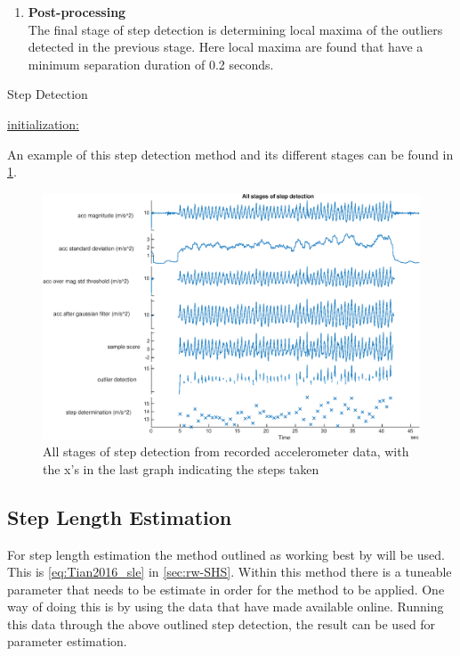 \begin{enumerate}
	
	\item \textbf{Post-processing} \\
	The final stage of step detection is determining local maxima of the outliers detected in the previous stage. Here local maxima are found that have a minimum separation duration of 0.2 seconds.
	
\end{enumerate}

\begin{algorithm}[]
	\SetAlgoLined
	\caption{Step Detection}
	\label{algo:step_detect}
	\underline{initialization:}\\
\end{algorithm}

An example of this step detection method and its different stages can be found in \cref{fig:all_stages_of_step_detection}.

\begin{figure}[H]
	\centering
	\includegraphics[width=1\linewidth]{images/20200924_1204_All_stages_of_step_detection}
	\caption[All stages of step detection ]{All stages of step detection from recorded accelerometer data, with the x's in the last graph indicating the steps taken }
	\label{fig:all_stages_of_step_detection}
\end{figure}
\subsection*{Step Length Estimation}
For step length estimation the method outlined as working best by \cite{Vezocnik2019} will be used. This is \eqref{eq:Tian2016_sle} in \cref{sec:rw-SHS}. Within this method there is a tuneable parameter that needs to be estimate in order for the method to be applied. One way of doing this is by using the data that \cite{Vezocnik2019} have made available online. Running this data through the above outlined step detection, the result can be used for parameter estimation.

